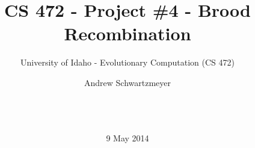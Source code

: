 \documentclass{acm_proc_article-sp}
\begin{document}
\title{CS 472 - Project \#4 - Brood Recombination}
\subtitle{University of Idaho - Evolutionary Computation (CS 472)}
%
%
%
%
%

%
\author{
%
%
\alignauthor
Andrew Schwartzmeyer\\
       \\
       \\
       \\
}
\date{9 May 2014}
\end{document}
